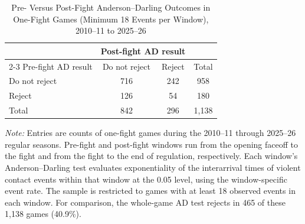 \begin{table}[htbp]
\centering
\caption{Pre- Versus Post-Fight Anderson--Darling Outcomes in One-Fight Games (Minimum 18 Events per Window), 2010--11 to 2025--26}
\label{tab:one_fight_AD_rejection_min_18_20102011_20252026}
\small
\renewcommand{\arraystretch}{1.15}
\setlength{\tabcolsep}{6pt}

\begin{tabular*}{0.78\textwidth}{@{\extracolsep{\fill}}lccc}
\toprule
 & \multicolumn{2}{c}{Post-fight AD result} & \\
\cmidrule(lr){2-3}
Pre-fight AD result & Do not reject & Reject & Total \\
\midrule
Do not reject & 716 & 242 & 958 \\
Reject & 126 & 54 & 180 \\
\midrule
Total & 842 & 296 & 1,138 \\
\bottomrule
\end{tabular*}

\vspace{0.4em}
\parbox{0.78\textwidth}{
\footnotesize
\textit{Note:} Entries are counts of one-fight games during the 2010--11 through 2025--26 regular seasons. Pre-fight and post-fight windows run from the opening faceoff to the fight and from the fight to the end of regulation, respectively. Each window's Anderson--Darling test evaluates exponentiality of the interarrival times of violent contact events within that window at the 0.05 level, using the window-specific event rate. The sample is restricted to games with at least 18 observed events in each window. For comparison, the whole-game AD test rejects in 465 of these 1,138 games (40.9\%).
}
\end{table}
